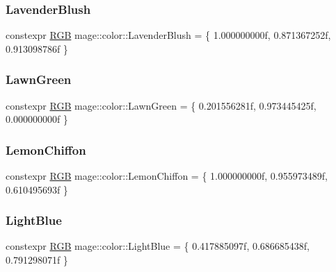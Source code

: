 \mbox{\label{namespacemage_1_1color_a1931b51916699fe6043528085a744912}} 
\subsubsection{\texorpdfstring{Lavender\+Blush}{LavenderBlush}}
{\footnotesize\ttfamily constexpr \mbox{\hyperlink{structmage_1_1_r_g_b}{R\+GB}} mage\+::color\+::\+Lavender\+Blush = \{ 1.\+000000000f, 0.\+871367252f, 0.\+913098786f \}}

\mbox{\label{namespacemage_1_1color_abb5025143228ccad532fc59bc3e0326c}} 
\subsubsection{\texorpdfstring{Lawn\+Green}{LawnGreen}}
{\footnotesize\ttfamily constexpr \mbox{\hyperlink{structmage_1_1_r_g_b}{R\+GB}} mage\+::color\+::\+Lawn\+Green = \{ 0.\+201556281f, 0.\+973445425f, 0.\+000000000f \}}

\mbox{\label{namespacemage_1_1color_a978bfddad2cebc2e3016ae777e2c420d}} 
\subsubsection{\texorpdfstring{Lemon\+Chiffon}{LemonChiffon}}
{\footnotesize\ttfamily constexpr \mbox{\hyperlink{structmage_1_1_r_g_b}{R\+GB}} mage\+::color\+::\+Lemon\+Chiffon = \{ 1.\+000000000f, 0.\+955973489f, 0.\+610495693f \}}

\mbox{\label{namespacemage_1_1color_a1890b43e1d4774c83e7cf5a4dcbf9c65}} 
\subsubsection{\texorpdfstring{Light\+Blue}{LightBlue}}
{\footnotesize\ttfamily constexpr \mbox{\hyperlink{structmage_1_1_r_g_b}{R\+GB}} mage\+::color\+::\+Light\+Blue = \{ 0.\+417885097f, 0.\+686685438f, 0.\+791298071f \}}

